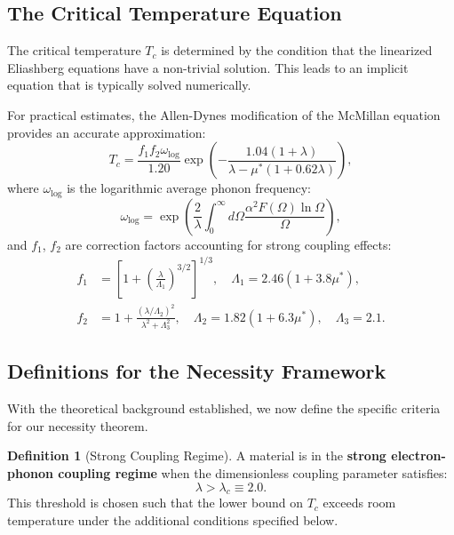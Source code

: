 \documentclass[11pt,a4paper]{article}
\theoremstyle{definition}
\newtheorem{definition}{Definition}[section]
\begin{document}
\subsection{The Critical Temperature Equation}

The critical temperature $T_c$ is determined by the condition that the linearized Eliashberg equations have a non-trivial solution. This leads to an implicit equation that is typically solved numerically.

For practical estimates, the Allen-Dynes modification \cite{allendynes1975} of the McMillan equation provides an accurate approximation:
\begin{equation}\label{eq:allendynes}
T_c = \frac{f_1 f_2 \omega_{\text{log}}}{1.20} \exp\left(-\frac{1.04(1+\lambda)}{\lambda - \mu^*(1+0.62\lambda)}\right),
\end{equation}
where $\omega_{\text{log}}$ is the logarithmic average phonon frequency:
\begin{equation}\label{eq:omegalog}
\omega_{\text{log}} = \exp\left(\frac{2}{\lambda}\int_0^\infty d\Omega \frac{\alpha^2F(\Omega)\ln\Omega}{\Omega}\right),
\end{equation}
and $f_1$, $f_2$ are correction factors accounting for strong coupling effects:
\begin{align}
f_1 &= \left[1 + \left(\frac{\lambda}{\Lambda_1}\right)^{3/2}\right]^{1/3}, \quad \Lambda_1 = 2.46(1 + 3.8\mu^*),\\
f_2 &= 1 + \frac{(\lambda/\Lambda_2)^2}{\lambda^2 + \Lambda_3^2}, \quad \Lambda_2 = 1.82(1 + 6.3\mu^*), \quad \Lambda_3 = 2.1.
\end{align}

\subsection{Definitions for the Necessity Framework}

With the theoretical background established, we now define the specific criteria for our necessity theorem.

\begin{definition}[Strong Coupling Regime]\label{def:strongcoupling}
A material is in the \textbf{strong electron-phonon coupling regime} when the dimensionless coupling parameter satisfies:
\begin{equation}
\lambda > \lambda_c \equiv 2.0.
\end{equation}
This threshold is chosen such that the lower bound on $T_c$ exceeds room temperature under the additional conditions specified below.
\end{definition}
\end{document}
